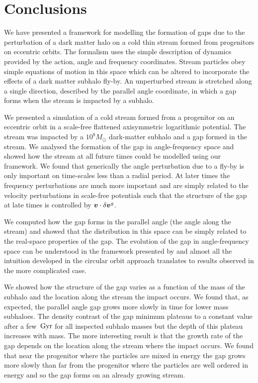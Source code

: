\documentclass[useAMS,usenatbib,fleqn,a4paper]{mn2e}
\def\Gyr{\,{\rm Gyr}}
\newcommand{\bs}[1]{\bmath{#1}}
\begin{document}
\section{Conclusions}\label{Sect::Conclusions}
We have presented a framework for modelling the formation of gaps due to the perturbation of a dark matter halo on a cold thin stream formed from progenitors on eccentric orbits. The formalism uses the simple description of dynamics provided by the action, angle and frequency coordinates. Stream particles obey simple equations of motion in this space which can be altered to incorporate the effects of a dark matter subhalo fly-by. An unperturbed stream is stretched along a single direction, described by the parallel angle coordinate, in which a gap forms when the stream is impacted by a subhalo.

We presented a simulation of a cold stream formed from a progenitor on an eccentric orbit in a scale-free flattened axisymmetric logarithmic potential. The stream was impacted by a $10^8M_\odot$ dark-matter subhalo and a gap formed in the stream. We analysed the formation of the gap in angle-frequency space and showed how the stream at all future times could be modelled using our framework. We found that generically the angle perturbation due to a fly-by is only important on time-scales less than a radial period. At later times the frequency perturbations are much more important and are simply related to the velocity perturbations in scale-free potentials such that the structure of the gap at late times is controlled by $\bs{v}\cdot\delta\bs{v}^g$.

We computed how the gap forms in the parallel angle (the angle along the stream) and showed that the distribution in this space can be simply related to the real-space properties of the gap. The evolution of the gap in angle-frequency space can be understood in the framework presented by \cite{ErkalBelokurov2015} and almost all the intuition developed in the circular orbit approach translates to results observed in the more complicated case.

We showed how the structure of the gap varies as a function of the mass of the subhalo and the location along the stream the impact occurs. We found that, as expected, the parallel angle gap grows more slowly in time for lower mass subhaloes. The density contrast of the gap minimum plateaus to a constant value after a few $\Gyr$ for all inspected subhalo masses but the depth of this plateau increases with mass. The more interesting result is that the growth rate of the gap depends on the location along the stream where the impact occurs. We found that near the progenitor where the particles are mixed in energy the gap grows more slowly than far from the progenitor where the particles are well ordered in energy and so the gap forms on an already growing stream.
\end{document}

